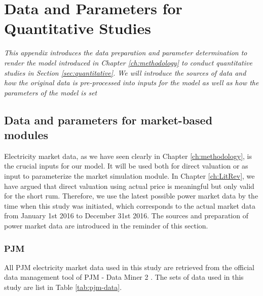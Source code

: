 
\chapter{Data and Parameters for Quantitative Studies}
\label{Appendix-data}
\textit{This appendix introduces the data preparation and parameter determination to render the model introduced in Chapter \ref{ch:methodology} to conduct quantitative studies in Section \ref{sec:quantitative}. We will introduce the sources of data and how the original data is pre-processed into inputs for the model as well as how the parameters of the model is set}

\section[Data and parameters for market-based modules]{Data and parameters for market-based modules%
	}
\label{sec:accounting-data-prepare}

Electricity market data, as we have seen clearly in Chapter \ref{ch:methodology}, is the crucial inputs for our model. It will be used both for direct valuation or as input to parameterize the market simulation module. In Chapter \ref{ch:LitRev}, we have argued that direct valuation using actual price is meaningful but only valid for the short rum. Therefore, we use the latest possible power market data by the time when this study was initiated, which corresponds to the actual market data from January 1st 2016 to December 31st 2016. The sources and preparation of power market data are introduced in the reminder of this section.

\subsection*{PJM}
All PJM electricity market data used in this study are retrieved from the official data management tool of PJM - Data Miner 2 \cite{Data_miner_2}. The sets of data used in this study are list in Table \ref{tab:pjm-data}.

